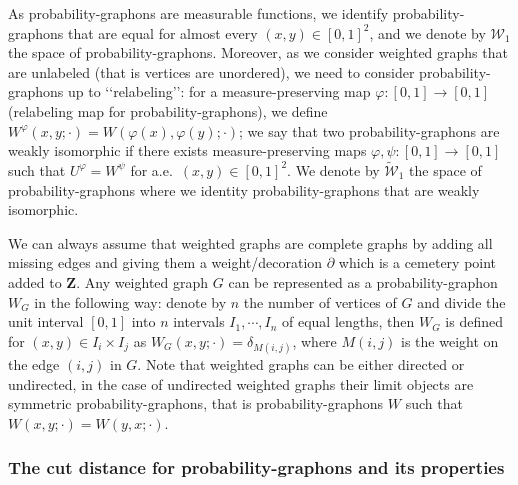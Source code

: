 \documentclass{amsart}
\newcommand{\aE}{a.e.\ }
\theoremstyle{plain}
\theoremstyle{definition}
\newcommand{\Space}{\mathbf{Z}}
\newcommand{\Graphon}{\mathcal{W}_1}
\newcommand{\UGraphon}{\widetilde{\mathcal{W}}_1}
\begin{document}
As probability-graphons are measurable functions, we identify probability-graphons that are equal
	for almost every $(x,y)\in [0,1]^2$, and we denote by $\Graphon$
		the space of probability-graphons.
Moreover, as we consider weighted graphs that are unlabeled (that is vertices are unordered),
	we need to consider probability-graphons up to ‘‘relabeling’’:
	for a measure-preserving map $\varphi : [0,1] \to [0,1]$ (relabeling map for probability-graphons),
		we define $W^\varphi(x,y;\cdot) = W(\varphi(x), \varphi(y);\cdot)$;
	we say that two probability-graphons are weakly isomorphic if there exists
		measure-preserving maps $\varphi, \psi : [0,1] \to [0,1]$
		such that $U^\varphi = W^\psi$ for \aE $(x,y)\in[0,1]^2$.
We denote by $\UGraphon$ the space of probability-graphons where we identity probability-graphons
	that are weakly isomorphic.

We can always assume that weighted graphs are complete graphs by adding all missing edges
	and giving them a weight/decoration $\partial$ which is a cemetery point added to $\Space$.
Any weighted graph $G$ can be represented as a probability-graphon $W_G$ in the following way:
	denote by $n$ the number of vertices of $G$ and
	divide the unit interval $[0,1]$ into $n$ intervals $I_1, \cdots, I_n$ of equal lengths,
	then $W_G$ is defined for $(x,y)\in I_i \times I_j$ as $W_G(x,y;\cdot) = \delta_{M(i,j)}$,
		where $M(i,j)$ is the weight on the edge $(i,j)$ in $G$.
Note that weighted graphs can be either directed or undirected,
	in the case of undirected weighted graphs their limit objects are symmetric probability-graphons,
	that is probability-graphons $W$ such that $W(x,y;\cdot) = W(y,x;\cdot)$.


\subsubsection{The cut distance for probability-graphons and its properties}
\end{document}
